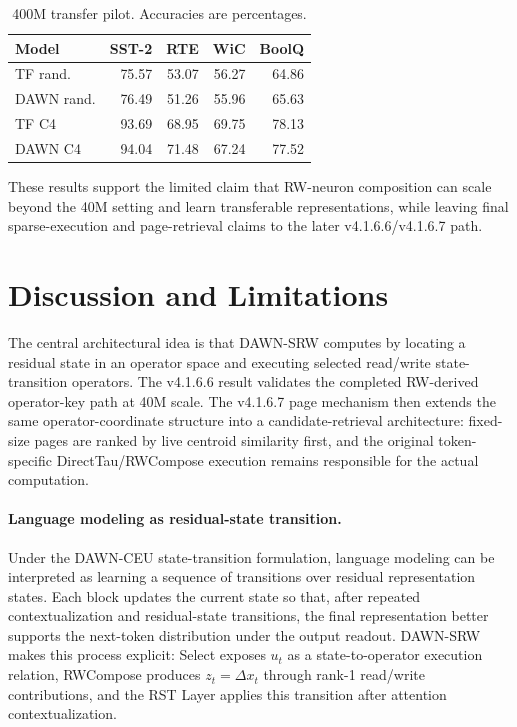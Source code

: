 \documentclass{article}
\begin{document}
\begin{table}[t]
\centering
\footnotesize
\setlength{\tabcolsep}{3pt}
\renewcommand{\arraystretch}{1.04}
\begin{tabular}{lrrrr}
\toprule
Model & SST-2 & RTE & WiC & BoolQ \\
\midrule
TF rand. & 75.57 & 53.07 & 56.27 & 64.86 \\
DAWN rand. & 76.49 & 51.26 & 55.96 & 65.63 \\
TF C4 & 93.69 & 68.95 & 69.75 & 78.13 \\
DAWN C4 & 94.04 & 71.48 & 67.24 & 77.52 \\
\bottomrule
\end{tabular}
\caption{400M transfer pilot. Accuracies are percentages.}
\label{tab:transfer_400m_compact}
\end{table}

These results support the limited claim that RW-neuron composition can scale beyond the 40M setting and learn transferable representations, while leaving final sparse-execution and page-retrieval claims to the later v4.1.6.6/v4.1.6.7 path.

\section{Discussion and Limitations}
\label{sec:discussion}

The central architectural idea is that DAWN-SRW computes by locating a residual state in an operator space and executing selected read/write state-transition operators. The v4.1.6.6 result validates the completed RW-derived operator-key path at 40M scale. The v4.1.6.7 page mechanism then extends the same operator-coordinate structure into a candidate-retrieval architecture: fixed-size pages are ranked by live centroid similarity first, and the original token-specific DirectTau/RWCompose execution remains responsible for the actual computation.

\paragraph{Language modeling as residual-state transition.}
Under the DAWN-CEU state-transition formulation, language modeling can be interpreted as learning a sequence of transitions over residual representation states. Each block updates the current state so that, after repeated contextualization and residual-state transitions, the final representation better supports the next-token distribution under the output readout. DAWN-SRW makes this process explicit: Select exposes \(u_t\) as a state-to-operator execution relation, RWCompose produces \(z_t=\Delta x_t\) through rank-1 read/write contributions, and the RST Layer applies this transition after attention contextualization.
\end{document}
